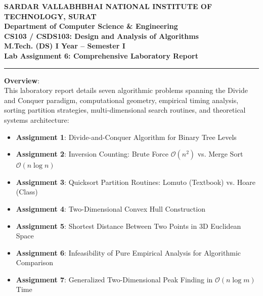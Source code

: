 \documentclass[12pt]{article}
\begin{document}
\begin{center}
\textbf{\Large SARDAR VALLABHBHAI NATIONAL INSTITUTE OF TECHNOLOGY, SURAT}\\[4pt]
\textbf{\large Department of Computer Science \& Engineering}\\[3pt]
\textbf{\large CS103 / CSDS103: Design and Analysis of Algorithms}\\[3pt]
\textbf{\large M.Tech. (DS) I Year -- Semester I}\\[4pt]
\textbf{\Large Lab Assignment 6: Comprehensive Laboratory Report}
\end{center}

\vspace{0.2cm}
\hrule
\vspace{0.4cm}

\textbf{Overview}:\\
This laboratory report details seven algorithmic problems spanning the Divide and Conquer paradigm, computational geometry, empirical timing analysis, sorting partition strategies, multi-dimensional search routines, and theoretical systems architecture:
\begin{itemize}
    \item \textbf{Assignment 1}: Divide-and-Conquer Algorithm for Binary Tree Levels
    \item \textbf{Assignment 2}: Inversion Counting: Brute Force $\mathcal{O}(n^2)$ vs. Merge Sort $\mathcal{O}(n \log n)$
    \item \textbf{Assignment 3}: Quicksort Partition Routines: Lomuto (Textbook) vs. Hoare (Class)
    \item \textbf{Assignment 4}: Two-Dimensional Convex Hull Construction
    \item \textbf{Assignment 5}: Shortest Distance Between Two Points in 3D Euclidean Space
    \item \textbf{Assignment 6}: Infeasibility of Pure Empirical Analysis for Algorithmic Comparison
    \item \textbf{Assignment 7}: Generalized Two-Dimensional Peak Finding in $\mathcal{O}(n \log m)$ Time
\end{itemize}

\vspace{0.3cm}

\end{document}
